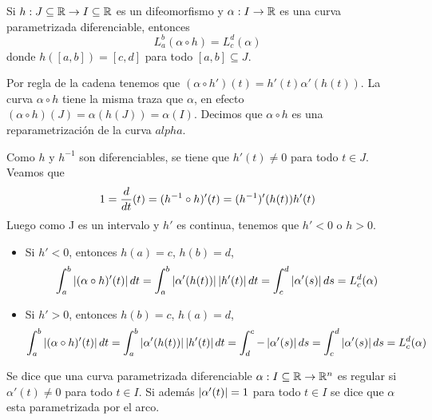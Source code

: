 \documentclass{article}
\begin{document}
\begin{cor}
    Si $h:J\subseteq\mathbb{R}\to I\subseteq\mathbb{R}$ es un difeomorfismo y $\alpha: I\to\mathbb{R}$ es una curva 
    parametrizada diferenciable, entonces
    \begin{equation*}
        L_{a}^{b}(\alpha\circ h)=L_{c}^{d}(\alpha)
    \end{equation*}
    donde $h([a,b])=[c,d]$ para todo $[a,b]\subseteq J$.
\end{cor}

\noindent Por regla de la cadena tenemos que $(\alpha\circ h')(t)=h'(t)\alpha'(h(t))$. La curva 
$\alpha\circ h$ tiene la misma traza que $\alpha$, en efecto $(\alpha\circ h)(J)=\alpha(h(J))=
\alpha(I)$. Decimos que $\alpha\circ h$ es una reparametrización de la curva $alpha$.

\begin{dem}
    Como $h$ y $h^{-1}$ son diferenciables, se tiene que $h'(t)\neq0$ para todo $t\in J$. Veamos
    que
    \begin{equation*}
        1=\frac{d}{dt}(t)=(h^{-1}\circ h)'(t)=(h^{-1})'(h(t))h'(t)
    \end{equation*}
    Luego como J es un intervalo y $h'$ es continua, tenemos que $h'<0$ o $h>0$.
    \begin{itemize}
        
        \item Si $h'<0$, entonces $h(a)=c$, $h(b)=d$,
        \begin{equation*}
            \int_{a}^{b}\left|(\alpha\circ h)'(t) \right|dt=\int_{a}^{b}\left|\alpha'(h(t)) \right|\left|h'(t) \right|dt=
            \int_{c}^{d}\left|\alpha'(s) \right|ds=L_{c}^{d}(\alpha)
        \end{equation*}

        \item Si $h'>0$, entonces $h(b)=c$, $h(a)=d$,
        \begin{equation*}
            \int_{a}^{b}\left|(\alpha\circ h)'(t) \right|dt=\int_{a}^{b}\left|\alpha'(h(t)) \right|\left|h'(t) \right|dt=
            \int_{d}^{c}-\left|\alpha'(s) \right|ds=\int_{c}^{d}\left|\alpha'(s) \right|ds=L_{c}^{d}(\alpha)
        \end{equation*}

    \end{itemize}
\end{dem}

\begin{dfn}
    Se dice que una curva parametrizada diferenciable $\alpha: I\subseteq\mathbb{R}\to\mathbb{R}^{n}$ es regular si
    $\alpha'(t)\neq0$ para todo $t\in I$. Si además $\left|\alpha'(t) \right|=1$ para todo $t\in I$ se dice
    que $\alpha$ esta parametrizada por el arco.
\end{dfn}
\end{document}
